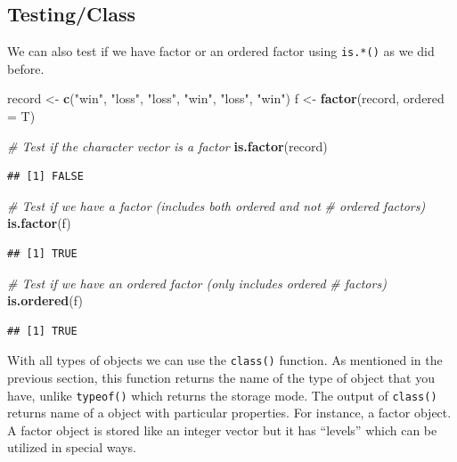 \documentclass[
]{book}
\newenvironment{Shaded}{\begin{snugshade}}{\end{snugshade}}
\newcommand{\CommentTok}[1]{\textcolor[rgb]{0.56,0.35,0.01}{\textit{#1}}}
\newcommand{\DataTypeTok}[1]{\textcolor[rgb]{0.13,0.29,0.53}{#1}}
\newcommand{\KeywordTok}[1]{\textcolor[rgb]{0.13,0.29,0.53}{\textbf{#1}}}
\newcommand{\NormalTok}[1]{#1}
\newcommand{\StringTok}[1]{\textcolor[rgb]{0.31,0.60,0.02}{#1}}
\begin{document}
\hypertarget{testingclass}{%
\subsection{Testing/Class}\label{testingclass}}

We can also test if we have factor or an ordered factor using \texttt{is.*()} as we did before.

\begin{Shaded}
\begin{Highlighting}[]
\NormalTok{record <-}\StringTok{ }\KeywordTok{c}\NormalTok{(}\StringTok{"win"}\NormalTok{, }\StringTok{"loss"}\NormalTok{, }\StringTok{"loss"}\NormalTok{, }\StringTok{"win"}\NormalTok{, }\StringTok{"loss"}\NormalTok{, }\StringTok{"win"}\NormalTok{)}
\NormalTok{f <-}\StringTok{ }\KeywordTok{factor}\NormalTok{(record, }\DataTypeTok{ordered =}\NormalTok{ T)}


\CommentTok{# Test if the character vector is a factor}
\KeywordTok{is.factor}\NormalTok{(record)}
\end{Highlighting}
\end{Shaded}

\begin{verbatim}
## [1] FALSE
\end{verbatim}

\begin{Shaded}
\begin{Highlighting}[]
\CommentTok{# Test if we have a factor (includes both ordered and not}
\CommentTok{# ordered factors)}
\KeywordTok{is.factor}\NormalTok{(f)}
\end{Highlighting}
\end{Shaded}

\begin{verbatim}
## [1] TRUE
\end{verbatim}

\begin{Shaded}
\begin{Highlighting}[]
\CommentTok{# Test if we have an ordered factor (only includes ordered}
\CommentTok{# factors)}
\KeywordTok{is.ordered}\NormalTok{(f)}
\end{Highlighting}
\end{Shaded}

\begin{verbatim}
## [1] TRUE
\end{verbatim}

With all types of objects we can use the \texttt{class()} function. As mentioned in the previous section, this function returns the name of the type of object that you have, unlike \texttt{typeof()} which returns the storage mode. The output of \texttt{class()} returns name of a object with particular properties. For instance, a factor object. A factor object is stored like an integer vector but it has ``levels'' which can be utilized in special ways.
\end{document}
